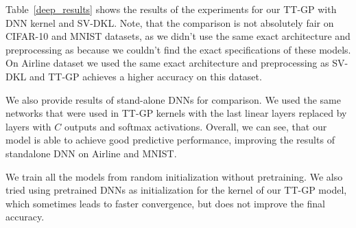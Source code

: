   Table~\ref{deep_results} shows the results of the experiments for our TT-GP
  with DNN kernel and SV-DKL. Note, that the comparison
  is not absolutely fair on CIFAR-10 and MNIST datasets, as we didn't use
  the same exact architecture and preprocessing as \citet{wilson2016stochastic}
  because we couldn't find the exact specifications of these models.
  On Airline dataset we used the same exact architecture and preprocessing as
  SV-DKL and TT-GP achieves a higher accuracy on this dataset.

  We also provide results of stand-alone DNNs for comparison. We used the
  same networks that were used in TT-GP kernels with the last linear layers replaced
  by layers with $C$ outputs and softmax activations. Overall, we can see, that
  our model is able to achieve good predictive performance,
  improving the results of standalone DNN on Airline and MNIST.

  We train all the models from random initialization without pretraining. We also
  tried using pretrained DNNs as initialization for the kernel of our TT-GP model,
  which sometimes leads to faster convergence, but does not improve the final
  accuracy.
